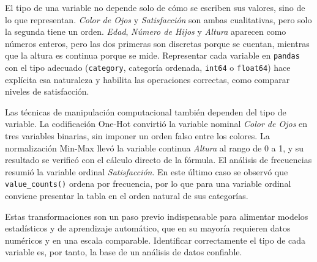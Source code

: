 \documentclass[11pt,letterpaper]{article}
\begin{document}
El tipo de una variable no depende solo de cómo se escriben sus valores, sino de lo que representan. \textit{Color de Ojos} y \textit{Satisfacción} son ambas cualitativas, pero solo la segunda tiene un orden. \textit{Edad}, \textit{Número de Hijos} y \textit{Altura} aparecen como números enteros, pero las dos primeras son discretas porque se cuentan, mientras que la altura es continua porque se mide. Representar cada variable en \texttt{pandas} con el tipo adecuado (\texttt{category}, categoría ordenada, \texttt{int64} o \texttt{float64}) hace explícita esa naturaleza y habilita las operaciones correctas, como comparar niveles de satisfacción.

Las técnicas de manipulación computacional también dependen del tipo de variable. La codificación One-Hot convirtió la variable nominal \textit{Color de Ojos} en tres variables binarias, sin imponer un orden falso entre los colores. La normalización Min-Max llevó la variable continua \textit{Altura} al rango de 0 a 1, y su resultado se verificó con el cálculo directo de la fórmula. El análisis de frecuencias resumió la variable ordinal \textit{Satisfacción}. En este último caso se observó que \texttt{value\_counts()} ordena por frecuencia, por lo que para una variable ordinal conviene presentar la tabla en el orden natural de sus categorías.

Estas transformaciones son un paso previo indispensable para alimentar modelos estadísticos y de aprendizaje automático, que en su mayoría requieren datos numéricos y en una escala comparable. Identificar correctamente el tipo de cada variable es, por tanto, la base de un análisis de datos confiable.

\end{document}
